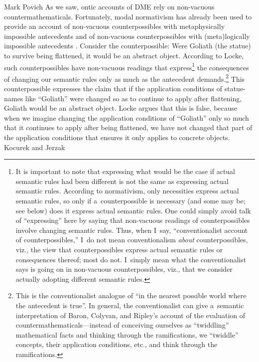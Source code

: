 \begin{artengenv}{Mark Povich}
As we saw, ontic accounts of DME rely on non-vacuous countermathematicals. Fortunately, modal normativism has already been used to provide an account of non-vacuous counterpossibles with metaphysically impossible antecedents
\parencite[][]{locke_counterpossibles_2021} %
 and of non-vacuous counterpossibles with (meta)logically impossible antecedents 
\parencite[][]{kocurek_counterlogicals_2021}. %
 Consider the counterpossible: Were Goliath (the statue) to survive being flattened, it would be an abstract object. According to Locke, such counterpossibles have non-vacuous readings that express\footnote{It is important to note that expressing what would be the case if actual semantic rules had been different is not the same as expressing actual semantic rules. According to normativism, only necessities express actual semantic rules, so only if a~counterpossible is necessary (and some may be; see below) does it express actual semantic rules. One could simply avoid talk of ``expressing'' here by saying that non-vacuous readings of counterpossibles involve changing semantic rules. Thus, when I~say, ``conventionalist account of counterpossibles,'' I~do not mean conventionalism \textit{about} counterpossibles, viz., the view that counterpossibles express actual semantic rules or consequences thereof; most do not. I~simply mean what the conventionalist says is going on in non-vacuous counterpossibles, viz., that we consider actually adopting different semantic rules.} the consequences of changing our semantic rules only as much as the antecedent demands.\footnote{This is the conventionalist analogue of ``in the nearest possible world where the antecedent is true''. In general, the conventionalist can give a~semantic interpretation of Baron, Colyvan, and Ripley's 
\parencite*[][]{baron_how_2017} %
 account of the evaluation of countermathematicals---instead of conceiving ourselves as ``twiddling'' mathematical facts and thinking through the ramifications, we ``twiddle'' concepts, their application conditions, etc., and think through the ramifications.} This counterpossible expresses the claim that if the application conditions of statue-names like ``Goliath'' were changed so as to continue to apply after flattening, Goliath would be an abstract object. Locke argues that this is false, because when we imagine changing the application conditions of ``Goliath'' only so much that it continues to apply after being flattened, we have not changed that part of the application conditions that ensures it only applies to concrete objects. Kocurek and Jerzak 

\end{artengenv}
